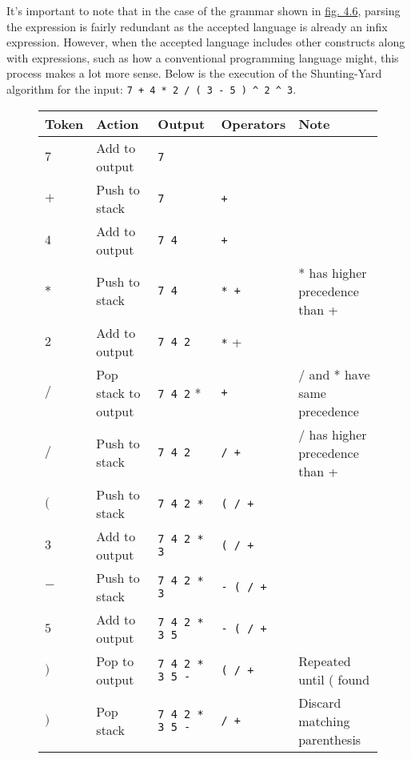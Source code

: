 It's important to note that in the case of the grammar shown in \hyperref[fig:4.6]{fig. 4.6}, parsing the expression is fairly redundant as the accepted language is already an infix expression. However, when the accepted language includes other constructs along with expressions, such as how a conventional programming language might, this process makes a lot more sense. Below is the execution of the Shunting-Yard algorithm for the input: \verb|7 + 4 * 2 / ( 3 - 5 ) ^ 2 ^ 3|.\textsuperscript{\cite{shunting-yard}}

\begin{figure}[H]
    \begin{center}
        \begin{tabular}{| m{1.2cm} | m{3.1cm} | m{3.6cm} | m{2.3cm} | m{3.5cm} |}
            \hline
            \textbf{Token} & \textbf{Action} & \textbf{Output} & \textbf{Operators} & \textbf{Note}\\
            \hline
            $7$ & Add to output & \verb|7| & &\\
            \hline
            $+$ & Push to stack & \verb|7| & \verb|+| &\\
            \hline
            $4$ & Add to output & \verb|7 4| & \verb|+| &\\
            \hline
            $*$ & Push to stack & \verb|7 4| & \verb|* +| & * has higher precedence than +\\
            \hline
            $2$ & Add to output & \verb|7 4 2| & \verb|*| + &\\
            \hline
            $/$ & Pop stack to output & \verb|7 4 2| * & \verb|+| & / and * have same precedence\\
            \hline
            $/$ & Push to stack & \verb|7 4 2| & \verb|/ +| & / has higher precedence than +\\
            \hline
            $($ & Push to stack & \verb|7 4 2 *| & \verb|( / +| &\\
            \hline
            $3$ & Add to output & \verb|7 4 2 * 3| & \verb|( / +| &\\
            \hline
            $-$ & Push to stack & \verb|7 4 2 * 3| & \verb|- ( / +| &\\
            \hline
            $5$ & Add to output & \verb|7 4 2 * 3 5| & \verb|- ( / +| &\\
            \hline
            $)$ & Pop to output & \verb|7 4 2 * 3 5 -| & \verb|( / +| & Repeated until ( found\\
            \hline
            $)$ & Pop stack & \verb|7 4 2 * 3 5 -| & \verb|/ +| & Discard matching parenthesis\\

\end{tabular}
\end{center}
\end{figure}
